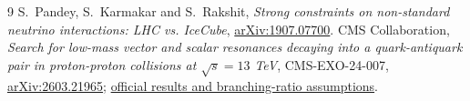 \documentclass[11pt,a4paper]{article}
\begin{document}
\begin{thebibliography}{9}
 S.~Pandey, S.~Karmakar and S.~Rakshit,
\emph{Strong constraints on non-standard neutrino interactions: LHC vs. IceCube},
\href{https://arxiv.org/abs/1907.07700}{arXiv:1907.07700}.
 CMS Collaboration,
\emph{Search for low-mass vector and scalar resonances decaying into a
quark-antiquark pair in proton-proton collisions at $\sqrt{s}=13$ TeV},
CMS-EXO-24-007, \href{https://arxiv.org/abs/2603.21965}{arXiv:2603.21965};
\href{https://cms-results.web.cern.ch/cms-results/public-results/publications/EXO-24-007/}{official results and branching-ratio assumptions}.
\end{thebibliography}
\end{document}
